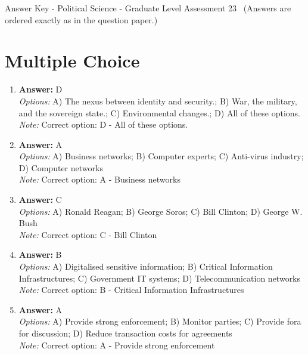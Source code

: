 \documentclass[12pt]{article}
\begin{document}
\begin{center}
Answer Key - Political Science - Graduate Level Assessment 23 \
\small (Answers are ordered exactly as in the question paper.)
\end{center}

\section*{Multiple Choice}
\begin{enumerate}[label=\arabic*.]
\item \textbf{Answer:} D
\\ \textit{Options:} A) The nexus between identity and security.; B) War, the military, and the sovereign state.; C) Environmental changes.; D) All of these options.
\\ \textit{Note:} Correct option: D - All of these options.
\item \textbf{Answer:} A
\\ \textit{Options:} A) Business networks; B) Computer experts; C) Anti-virus industry; D) Computer networks
\\ \textit{Note:} Correct option: A - Business networks
\item \textbf{Answer:} C
\\ \textit{Options:} A) Ronald Reagan; B) George Soros; C) Bill Clinton; D) George W. Bush
\\ \textit{Note:} Correct option: C - Bill Clinton
\item \textbf{Answer:} B
\\ \textit{Options:} A) Digitalised sensitive information; B) Critical Information Infrastructures; C) Government IT systems; D) Telecommunication networks
\\ \textit{Note:} Correct option: B - Critical Information Infrastructures
\item \textbf{Answer:} A
\\ \textit{Options:} A) Provide strong enforcement; B) Monitor parties; C) Provide fora for discussion; D) Reduce transaction costs for agreements
\\ \textit{Note:} Correct option: A - Provide strong enforcement
\end{enumerate}
\end{document}
